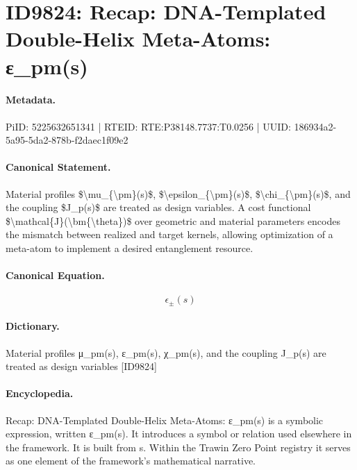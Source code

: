 \section*{ID9824: Recap: DNA-Templated Double-Helix Meta-Atoms: ε\_pm(s)}
\paragraph{Metadata.}
PiID: 5225632651341 | RTEID: RTE:P38148.7737:T0.0256 | UUID: 186934a2-5a95-5da2-878b-f2daec1f09e2

\paragraph{Canonical Statement.}
Material profiles \$\textbackslash{}mu\_\{\textbackslash{}pm\}(s)\$, \$\textbackslash{}epsilon\_\{\textbackslash{}pm\}(s)\$, \$\textbackslash{}chi\_\{\textbackslash{}pm\}(s)\$, and the coupling \$J\_p(s)\$ are treated as design variables. A cost functional \$\textbackslash{}mathcal\{J\}(\textbackslash{}bm\{\textbackslash{}theta\})\$ over geometric and material parameters encodes the mismatch between realized and target kernels, allowing optimization of a meta-atom to implement a desired entanglement resource.

\paragraph{Canonical Equation.}
\[
\epsilon_{\pm}(s)
\]

\paragraph{Dictionary.}
Material profiles μ\_pm(s), ε\_pm(s), χ\_pm(s), and the coupling J\_p(s) are treated as design variables [ID9824]

\paragraph{Encyclopedia.}
Recap: DNA-Templated Double-Helix Meta-Atoms: ε\_pm(s) is a symbolic expression, written ε\_pm(s). It introduces a symbol or relation used elsewhere in the framework. It is built from s. Within the Trawin Zero Point registry it serves as one element of the framework's mathematical narrative.
